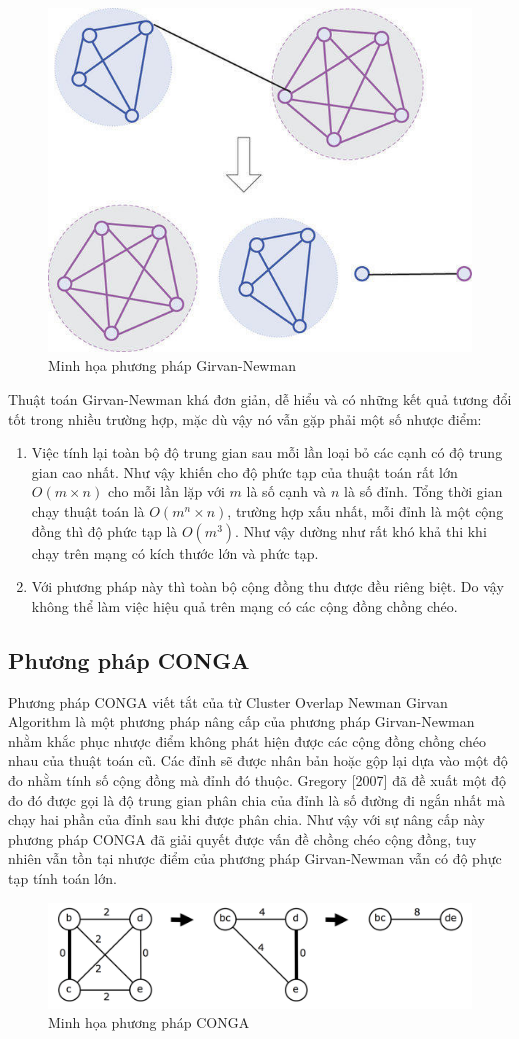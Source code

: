 \begin{figure}[H]
	\centering
	\includegraphics[width=0.5\linewidth]{Chapter1/Chapter1Figs/girvannewman}
	\caption{Minh họa phương pháp Girvan-Newman}
	\label{fig:girvannewman}
\end{figure}
Thuật toán Girvan-Newman khá đơn giản, dễ hiểu và có những kết quả tương đổi tốt trong nhiều trường hợp, mặc dù vậy nó vẫn gặp phải một số nhược điểm:
\begin{enumerate}
	\item Việc tính lại toàn bộ độ trung gian sau mỗi lần loại bỏ các cạnh có độ trung gian cao nhất. Như vậy khiến cho độ phức tạp của thuật toán rất lớn $O(m\times n)$ cho mỗi lần lặp với $m$ là số cạnh và $n$ là số đỉnh. Tổng thời gian chạy thuật toán là $O(m^n\times n)$, trường hợp xấu nhất, mỗi đỉnh là một cộng đồng thì độ phức tạp là $O(m^3)$. Như vậy dường như rất khó khả thi khi chạy trên mạng có kích thước lớn và phức tạp.
	\item Với phương pháp này thì toàn bộ cộng đồng thu được đều riêng biệt. Do vậy không thể làm việc hiệu quả trên mạng có các cộng đồng chồng chéo.
\end{enumerate}

\subsection{Phương pháp CONGA}
Phương pháp CONGA viết tắt của từ Cluster Overlap Newman Girvan Algorithm là một phương pháp nâng cấp của phương pháp Girvan-Newman nhằm khắc phục nhược điểm không phát hiện được các cộng đồng chồng chéo nhau của thuật toán cũ. Các đỉnh sẽ được nhân bản hoặc gộp lại dựa vào một độ đo nhằm tính số cộng đồng mà đỉnh đó thuộc. Gregory [2007] \cite{gregory2007algorithm} đã đề xuất một độ đo đó được gọi là độ trung gian phân chia của đỉnh là số đường đi ngắn nhất mà chạy hai phần của đỉnh sau khi được phân chia. Như vậy với sự nâng cấp này phương pháp CONGA đã giải quyết được vấn đề chồng chéo cộng đồng, tuy nhiên vẫn tồn tại nhược điểm của phương pháp Girvan-Newman vẫn có độ phực tạp tính toán lớn.
\begin{figure}[H]
	\centering
	\includegraphics[width=0.8\linewidth]{Chapter1/Chapter1Figs/CONGA}
	\caption{Minh họa phương pháp CONGA}
	\label{fig:conga}
\end{figure}
